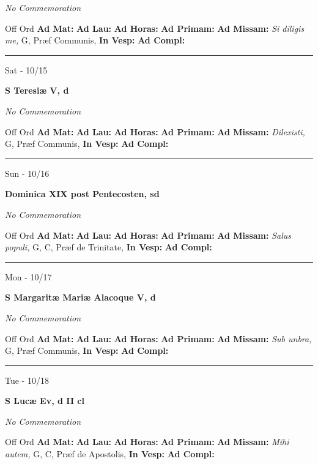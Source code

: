 \documentclass[letterpaper, 10pt]{article}
\begin{document}
\textit{No Commemoration}\begin{justify}
Off Ord
\textbf{Ad Mat: }
\textbf{Ad Lau: }
\textbf{Ad Horas: }
\textbf{Ad Primam: }
\textbf{Ad Missam:} \textit{Si diligis me, } G, Præf Communis, 
\textbf{In Vesp: }
\textbf{Ad Compl: }\end{justify}



\hrule
\begin{center}
Sat - 10/15
\end{center}\textbf{ \large S Teresiæ V, \textnormal{\normalsize d}}

\textit{No Commemoration}\begin{justify}
Off Ord
\textbf{Ad Mat: }
\textbf{Ad Lau: }
\textbf{Ad Horas: }
\textbf{Ad Primam: }
\textbf{Ad Missam:} \textit{Dilexisti, } G, Præf Communis, 
\textbf{In Vesp: }
\textbf{Ad Compl: }\end{justify}



\hrule
\begin{center}
Sun - 10/16
\end{center}\textbf{ \large Dominica XIX post Pentecosten, \textnormal{\normalsize sd}}

\textit{No Commemoration}\begin{justify}
Off Ord
\textbf{Ad Mat: }
\textbf{Ad Lau: }
\textbf{Ad Horas: }
\textbf{Ad Primam: }
\textbf{Ad Missam:} \textit{Salus populi, } G, C, Præf de Trinitate, 
\textbf{In Vesp: }
\textbf{Ad Compl: }\end{justify}



\hrule
\begin{center}
Mon - 10/17
\end{center}\textbf{ \large S Margaritæ Mariæ Alacoque V, \textnormal{\normalsize d}}

\textit{No Commemoration}\begin{justify}
Off Ord
\textbf{Ad Mat: }
\textbf{Ad Lau: }
\textbf{Ad Horas: }
\textbf{Ad Primam: }
\textbf{Ad Missam:} \textit{Sub unbra, } G, Præf Communis, 
\textbf{In Vesp: }
\textbf{Ad Compl: }\end{justify}



\hrule
\begin{center}
Tue - 10/18
\end{center}\textbf{ \large S Lucæ Ev, \textnormal{\normalsize d II cl}}

\textit{No Commemoration}\begin{justify}
Off Ord
\textbf{Ad Mat: }
\textbf{Ad Lau: }
\textbf{Ad Horas: }
\textbf{Ad Primam: }
\textbf{Ad Missam:} \textit{Mihi autem, } G, C, Præf de Apostolis, 
\textbf{In Vesp: }
\textbf{Ad Compl: }\end{justify}
\end{document}
